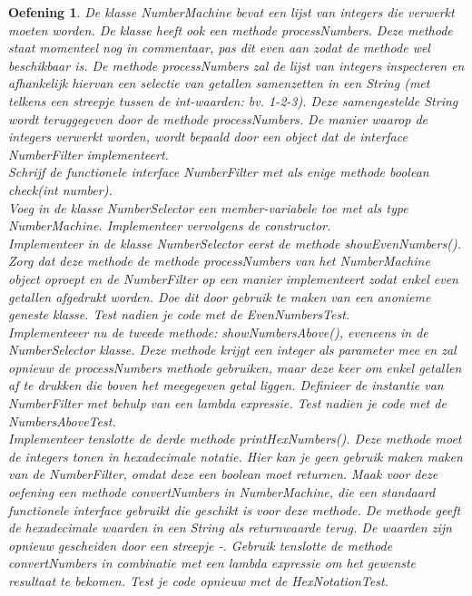 \documentclass{tstextbook}
\newtheorem{envoefening}{Oefening}[chapter]
\newenvironment{oefening}
               {\begin{boxexercise}\begin{envoefening}}
               {\end{envoefening}\end{boxexercise}}
\begin{document}
\begin{oefening}
De klasse \textit{NumberMachine} bevat een lijst van integers die verwerkt moeten worden. De klasse heeft ook een methode \textit{processNumbers}. Deze methode staat momenteel nog in commentaar, pas dit even aan zodat de methode wel beschikbaar is. De methode processNumbers zal de lijst van integers inspecteren en afhankelijk hiervan
een selectie van getallen samenzetten in een String (met telkens een streepje tussen de int-waarden: bv.
1-2-3). Deze samengestelde String wordt teruggegeven door de methode processNumbers. De manier waarop de integers verwerkt worden,
wordt bepaald door een object dat de interface \textit{NumberFilter} implementeert.\\

Schrijf de functionele interface \textit{NumberFilter} met als enige methode boolean check(int number).\\

Voeg in de klasse \textit{NumberSelector} een member-variabele toe met als type NumberMachine. Implementeer vervolgens de constructor.\\ 

Implementeer in de klasse  \textit{NumberSelector} eerst de methode \textit{showEvenNumbers()}. Zorg dat deze methode de methode processNumbers van
het NumberMachine object oproept en de NumberFilter op een manier implementeert zodat enkel even
getallen afgedrukt worden. Doe dit door gebruik te maken van een anonieme geneste klasse.
Test nadien je code met de EvenNumbersTest.\\

Implementeeer nu de tweede methode: \textit{showNumbersAbove()}, eveneens in de NumberSelector klasse. Deze
methode krijgt een integer als parameter mee en zal opnieuw de processNumbers methode gebruiken,
maar deze keer om enkel getallen af te drukken die boven het meegegeven getal liggen. Definieer de
instantie van NumberFilter met behulp van een lambda expressie.
Test nadien je code met de NumbersAboveTest.\\

Implementeer tenslotte de derde methode \textit{printHexNumbers()}. Deze methode moet de integers tonen in
hexadecimale notatie. Hier kan je geen gebruik maken
maken van de NumberFilter, omdat deze een boolean moet returnen. Maak voor deze oefening een
methode \textit{convertNumbers} in \textit{NumberMachine}, die een standaard functionele interface gebruikt die
geschikt is voor deze methode. De methode geeft de hexadecimale waarden in een String als
returnwaarde terug. De waarden zijn opnieuw gescheiden door een streepje -. Gebruik tenslotte de
methode convertNumbers in combinatie met een lambda expressie om het gewenste resultaat te
bekomen.
Test je code opnieuw met de HexNotationTest.
\end{oefening}
\end{document}

